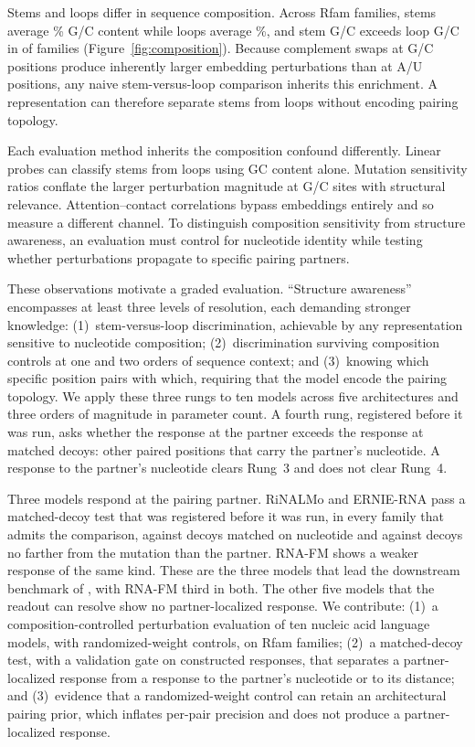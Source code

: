 \documentclass[11pt]{article}
\begin{document}
Stems and loops differ in sequence composition. Across \panelN{} Rfam families,
stems average \panelStemGC{}\% G/C content while loops average
\panelLoopGC{}\%, and stem G/C exceeds loop G/C in \panelGCEnriched{} of
\panelGCScored{} families (Figure~\ref{fig:composition}). Because complement swaps at G/C positions
produce inherently larger embedding perturbations than at A/U positions,
any naive stem-versus-loop comparison inherits this enrichment. A
representation can therefore separate stems from loops without encoding
pairing topology.

Each evaluation method inherits the composition confound differently.
Linear probes can classify stems from loops using GC content alone.
Mutation sensitivity ratios conflate the larger perturbation magnitude at
G/C sites with structural relevance. Attention--contact correlations
bypass embeddings entirely and so measure a different channel. To
distinguish composition sensitivity from structure awareness, an
evaluation must control for nucleotide identity while testing whether
perturbations propagate to specific pairing partners.

These observations motivate a graded evaluation.
``Structure awareness'' encompasses at least three levels of
resolution, each demanding stronger knowledge: (1)~stem-versus-loop
discrimination, achievable by any representation sensitive to
nucleotide composition; (2)~discrimination surviving composition
controls at one and two orders of sequence context; and (3)~knowing
which specific position pairs with which, requiring that the model
encode the pairing topology. We apply these three rungs to ten models across five architectures
and three orders of magnitude in parameter count. A fourth rung, registered
before it was run, asks whether the response at the partner exceeds the
response at matched decoys: other paired positions that carry the partner's
nucleotide. A response to the partner's nucleotide clears Rung~3 and does not
clear Rung~4.

Three models respond at the pairing partner. RiNALMo and ERNIE-RNA pass a
matched-decoy test that was registered before it was run, in every family that
admits the comparison, against decoys matched on nucleotide and against decoys
no farther from the mutation than the partner. RNA-FM shows a weaker response
of the same kind. These are the three models that lead the downstream
benchmark of \citet{zablocki2025benchmarking}, with RNA-FM third in both. The other
five models that the readout can resolve show no partner-localized response.
We contribute: (1)~a composition-controlled perturbation evaluation of ten
nucleic acid language models, with randomized-weight controls, on \panelN{}
Rfam families; (2)~a matched-decoy test, with a validation gate on constructed
responses, that separates a partner-localized response from a response to the
partner's nucleotide or to its distance; and (3)~evidence that a
randomized-weight control can retain an architectural pairing prior, which
inflates per-pair precision and does not produce a partner-localized response.
\end{document}
